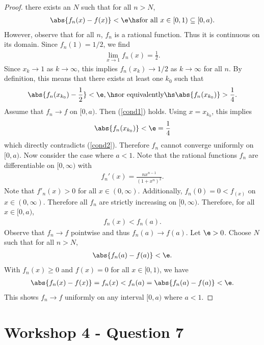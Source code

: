 \documentclass{article}
\begin{document}
\begin{proof}
	there exists an $N$ such that for all $n>N$,
	\begin{align}
		\label{cond1}
		\abs{f_n(x)-f(x)} < \e \hs\text{for all }x\in [0, 1) \subseteq [0, a).
	\end{align}
	However, observe that for all $n$, $f_n$ is a rational function. Thus it is
	continuous on its domain. Since $f_n(1)=1/2$, we find
	\begin{align*}
		\lim_{x\to 1} f_n(x) = \frac{1}{2}.
	\end{align*}
	Since $x_k\to 1$ as $k\to\infty$, this implies $f_n(x_k)\to 1/2$ as $k\to\infty$ for all $n$.
	By definition, this means that there exists at least one $k_0$ such that
	\begin{align}
		\label{cond2}
		\abs{f_n(x_{k_0}) - \frac{1}{2}} < \e, \hs\text{or equivalently}\hs \abs{f_n(x_{k_0})} > \frac{1}{4}.
	\end{align}
	Assume that $f_n\to f$ on $[0, a)$. Then (\ref{cond1}) holds. Using $x=x_{k_0}$, this implies
	\begin{align*}
		\abs{f_n(x_{k_0})} < \e = \frac{1}{4}
	\end{align*}
	which directly contradicts (\ref{cond2}). Therefore $f_n$ cannot converge uniformly on $[0, a)$.
	Now consider the case where $a<1$.
	Note that the rational functions $f_n$ are differentiable on $[0, \infty)$ with
	\begin{align*}
		f_n'(x) =  \frac{nx^{n-1}}{(1+x^n)^2}.
	\end{align*}
	Note that $f'_n(x)>0$ for all $x\in(0,\infty)$. Additionally, $f_n(0) = 0 < f_(x)$ on $x\in(0, \infty)$.
	Therefore all $f_n$ are strictly increasing on $[0, \infty)$. Therefore, for all $x\in[0,a)$,
	\begin{align}
		f_n(x) < f_n(a).
	\end{align}
	Observe that $f_n\to f$ pointwise and thus $f_n(a)\to f(a)$. Let $\e>0$. Choose $N$ such that
	for all $n>N$,
	\begin{align*}
		\abs{f_n(a)-f(a)} < \e.
	\end{align*}
	With $f_n(x)\geq 0$ and $f(x)=0$ for all $x\in[0,1)$, we have
	\begin{align*}
		\abs{f_n(x)-f(x)}=f_n(x)<f_n(a)=\abs{f_n(a) - f(a)} < \e.
	\end{align*}
	This shows $f_n\to f$ uniformly on any interval $[0, a)$ where $a<1$.
\end{proof}

\section*{Workshop 4 - Question 7}
\end{document}
